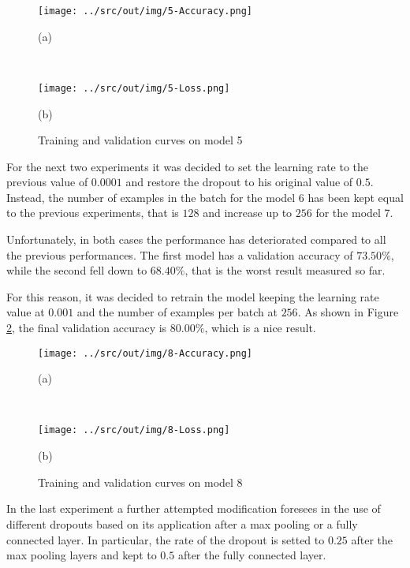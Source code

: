 \documentclass[a4paper,12pt]{article} %
\begin{document}
	\begin{figure}[htb]
		\begin{minipage}[c]{.49\textwidth}
			\centering
			\texttt{[image: ../src/out/img/5-Accuracy.png]}
			\caption*{(a)}
		\end{minipage}
		~
		\begin{minipage}[c]{.49\textwidth}
			\centering
			\texttt{[image: ../src/out/img/5-Loss.png]}
			\caption*{(b)}
		\end{minipage}
		\caption{Training and validation curves on model 5}
		\label{fig:model5-performance}
	\end{figure}

	For the next two experiments it was decided to set the learning rate to the 
	previous value of $0.0001$ and restore the dropout to his original value of 
	$0.5$. Instead, the number of examples in the batch for the model 6 has 
	been kept equal to the previous experiments, that is $128$ and increase up 
	to $256$ for the model 7. 

	Unfortunately, in both cases the performance has deteriorated compared to 
	all the previous performances. The first model has a validation accuracy of 
	$73.50\%$, while the second fell down to $68.40\%$, that is the worst result
	measured so far.
	\newline
	
	For this reason, it was decided to retrain the model keeping the learning 
	rate value at $0.001$ and the number of examples per batch at $256$.
	As shown in Figure \ref{fig:model8-performance}, the final validation 
	accuracy is $80.00\%$, which is a nice result.
	\newline
	
	\begin{figure}[htb]
		\begin{minipage}[c]{.49\textwidth}
			\centering
			\texttt{[image: ../src/out/img/8-Accuracy.png]}
			\caption*{(a)}
		\end{minipage}
		~
		\begin{minipage}[c]{.49\textwidth}
			\centering
			\texttt{[image: ../src/out/img/8-Loss.png]}
			\caption*{(b)}
		\end{minipage}
		\caption{Training and validation curves on model 8}
		\label{fig:model8-performance}
	\end{figure}

	In the last experiment a further attempted modification foresees in the use 
	of different dropouts based on its application after a max pooling or a 
	fully connected layer. In particular, the rate of the dropout is setted to 
	$0.25$ after the max pooling layers and kept to $0.5$ after the fully 
	connected layer.
	
\end{document}
